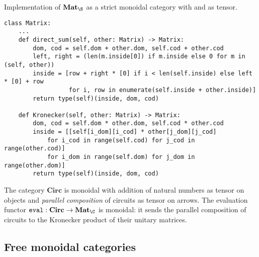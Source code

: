 \begin{python}
{\normalfont Implementation of $\mathbf{Mat}_\S$ as a strict monoidal category with  and  as tensor.}

\begin{verbatim}
class Matrix:
    ...
    def direct_sum(self, other: Matrix) -> Matrix:
        dom, cod = self.dom + other.dom, self.cod + other.cod
        left, right = (len(m.inside[0]) if m.inside else 0 for m in (self, other))
        inside = [row + right * [0] if i < len(self.inside) else left * [0] + row
                  for i, row in enumerate(self.inside + other.inside)]
        return type(self)(inside, dom, cod)

    def Kronecker(self, other: Matrix) -> Matrix:
        dom, cod = self.dom * other.dom, self.cod * other.cod
        inside = [[self[i_dom][i_cod] * other[j_dom][j_cod]
            for i_cod in range(self.cod) for j_cod in range(other.cod)]
            for i_dom in range(self.dom) for j_dom in range(other.dom)]
        return type(self)(inside, dom, cod)
\end{verbatim}
\end{python}

\begin{example}
The category $\mathbf{Circ}$ is monoidal with addition of natural numbers as tensor on objects and \emph{parallel composition} of circuits as tensor on arrows.
The evaluation functor $\mathtt{eval} : \mathbf{Circ} \to \mathbf{Mat}_\C$ is monoidal: it sends the parallel composition of circuits to the Kronecker product of their unitary matrices.
\end{example}

\subsection{Free monoidal categories}

